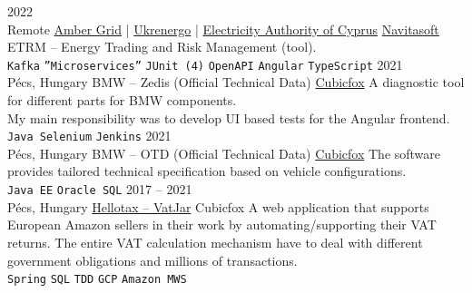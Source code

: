 \documentclass[9pt]{developercv} %
\begin{document}


\begin{entrylist}
    \entry
        {2022 \\ Remote}
        {\href{https://www.ambergrid.lt/en/}{Amber Grid} | \href{https://en.wikipedia.org/wiki/Ukrenergo}{Ukrenergo} | \href{https://en.wikipedia.org/wiki/Electricity_Authority_of_Cyprus}{Electricity Authority of Cyprus}}
        {\href{https://navitasoft.com/en}{Navitasoft}}
        {ETRM -- Energy Trading and Risk Management (tool). \\
            \texttt{Kafka}\slashsep
            \texttt{''Microservices''}\slashsep
            \texttt{JUnit (4)}\slashsep
            \texttt{OpenAPI}\slashsep
            \texttt{Angular}\slashsep
            \texttt{TypeScript}
        }
    \entry
        {2021 \\ Pécs, Hungary}
        {BMW -- Zedis (Official Technical Data)}
        {\href{https://cubicfox.com/}{Cubicfox}}
        {A diagnostic tool for different parts for BMW components.\\
            My main responsibility was to develop UI based tests for the Angular frontend.\\
            \texttt{Java Selenium}\slashsep
            \texttt{Jenkins}
        }
    \entry
        {2021 \\ Pécs, Hungary}
        {BMW -- OTD (Official Technical Data)}
        {\href{https://cubicfox.com/}{Cubicfox}}
        {The software provides tailored technical specification based on vehicle configurations. \\
            \texttt{Java EE}\slashsep
            \texttt{Oracle SQL}
        }
    \entry
        {2017 -- 2021 \\ Pécs, Hungary}
        {\href{https://app.hellotax.com}{Hellotax -- VatJar}}
        {Cubicfox}
        {A web application that supports European Amazon sellers in their work by automating/supporting their VAT returns.
            The entire VAT calculation mechanism have to deal with different government obligations and millions of transactions. \\
            \texttt{Spring}\slashsep
            \texttt{SQL}\slashsep
            \texttt{TDD}\slashsep
            \texttt{GCP}\slashsep
            \texttt{Amazon MWS}
        }

\end{entrylist}
\end{document}
